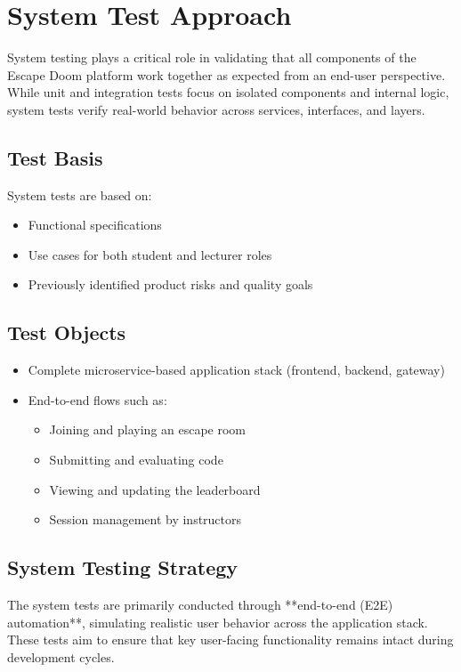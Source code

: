 \section{System Test Approach}
\label{section-system-test-approach}

System testing plays a critical role in validating that all components of the Escape Doom platform work together as expected from an end-user perspective. While unit and integration tests focus on isolated components and internal logic, system tests verify real-world behavior across services, interfaces, and layers.

\subsection*{Test Basis}
System tests are based on:
\begin{itemize}
    \item Functional specifications
    \item Use cases for both student and lecturer roles
    \item Previously identified product risks and quality goals
\end{itemize}

\subsection*{Test Objects}
\begin{itemize}
    \item Complete microservice-based application stack (frontend, backend, gateway)
    \item End-to-end flows such as:
    \begin{itemize}
        \item Joining and playing an escape room
        \item Submitting and evaluating code
        \item Viewing and updating the leaderboard
        \item Session management by instructors
    \end{itemize}
\end{itemize}

\subsection*{System Testing Strategy}

The system tests are primarily conducted through **end-to-end (E2E) automation**, simulating realistic user behavior across the application stack. These tests aim to ensure that key user-facing functionality remains intact during development cycles.


